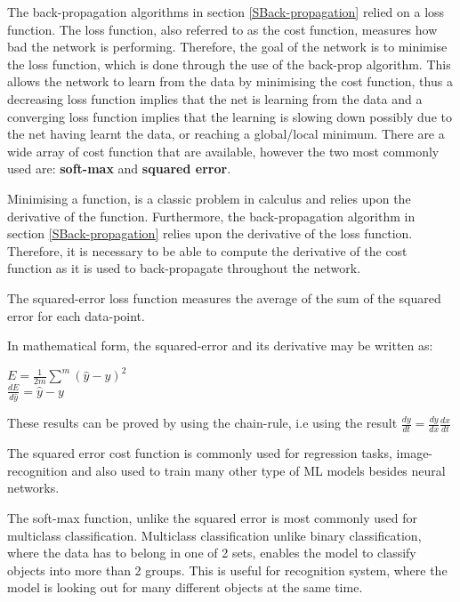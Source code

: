 The back-propagation algorithms in section \ref{SBack-propagation} relied on a loss function. The loss function, also referred to as the cost function, measures how bad the network is performing. Therefore, the goal of the network is to minimise the loss function, which is done through the use of the back-prop algorithm. This allows the network to learn from the data by minimising the cost function, thus a decreasing loss function implies that the net is learning from the data and a converging loss function implies that the learning is slowing down possibly due to the net having learnt the data, or reaching a global/local minimum. There are a wide array of cost function that are available, however the two most commonly used are: \textbf{soft-max} and 
\textbf{squared error}. 

Minimising a function, is a classic problem in calculus and relies upon the derivative of the function. Furthermore, the back-propagation algorithm in section \ref{SBack-propagation} relies upon the derivative of the loss function. Therefore, it is necessary to be able to compute the derivative of the cost function as it is used to back-propagate throughout the network.

The squared-error loss function measures the average of the sum of the squared error for each data-point.

In mathematical form, the squared-error and its derivative may be written as: 

\begin{center}
    $ E = \frac{1}{2m} \sum^m{(\hat{y}-y)^2}$ \\
    $ \frac{dE}{d\hat{y}} = \hat{y} - y $
\end{center}


These results can be proved by using the chain-rule, i.e using the result $\frac{dy}{dt} = \frac{dy}{dx} \frac{dx}{dt}$

The squared error cost function is commonly used for regression tasks, image-recognition and also used to train many other type of ML models besides neural networks.

The soft-max function, unlike the squared error is most commonly used for multiclass classification. Multiclass classification unlike binary classification, where the data has to belong in one of 2 sets, enables the model to classify objects into more than 2 groups. This is useful for recognition system, where the model is looking out for many different objects at the same time.


